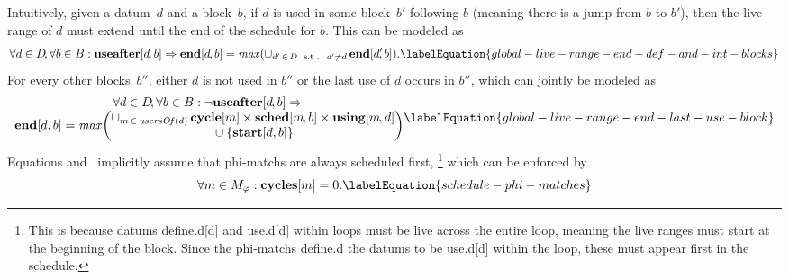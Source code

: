 Intuitively, given a \gls{datum}~$d$ and a \gls{block}~$b$\hspace{-1pt}, if $d$
is used in some \gls{block}~$b'$ following $b$ (meaning there is a jump from $b$
to $b'$), then the \gls{live range} of $d$ must extend until the end of the
schedule for $b$\hspace{-1pt}.
%
This can be modeled as
%
\begin{equation}
  \forall d \in \mDataSet \!,
  \forall b \in \mBlockSet :
  \mVar{useafter}[d \hspace{-1pt}, b]
  \mImp
  \mVar{end}[d \hspace{-1pt}, b]
  =
  \mMax(
    \cup_{d' \,\in\, \mDataSet \text{ \st } d' \neq d} \,
    \mVar{end}[d' \!\!, b]
  ).
  \labelEquation{global-live-range-end-def-and-int-blocks}
\end{equation}
%
For every other \glspl{block}~$b''\!$, either $d$ is not used in
$b''$ or the last use of $d$ occurs in $b''\!$, which can jointly be modeled as
%
\begin{equation}
  \begin{array}{@{}c@{}}
    \forall d \in \mDataSet \!,
    \forall b \in \mBlockSet :
    \neg\mVar{useafter}[d \hspace{-1pt}, b]
    \mImp \mbox{} \\
    \mVar{end}[d, b]
    =
    \mMax\!
    \left(
      \begin{array}{@{}c@{}}
        \cup_{m \,\in\, \mUsersOf(d)} \,
        \mVar{cycle}[m]
        \times
        \mVar{sched}[m \hspace{-1pt}, b]
        \times
        \mVar{using}[m \hspace{-1pt}, d] \\
        \mbox{} \cup
        \mSet{\mVar{start}[d, b]}
      \end{array}
    \right)
  \end{array}
  \labelEquation{global-live-range-end-last-use-block}
\end{equation}
%
Equations 
and~ implicitly assume that
\glspl{phi-match} are always scheduled first,%
%
\footnote{%
  This is because \glspl{datum} \gls{define.d}[d] and \gls{use.d}[d] within
  loops must be live across the entire loop, meaning the \glspl{live range} must
  start at the beginning of the \gls{block}.
  Since the \glspl{phi-match} \gls{define.d} the \glspl{datum} to be
  \gls{use.d}[d] within the loop, these must appear first in the schedule.
}
which can be enforced by
%
\begin{equation}
  \forall m \in \mPhiMatchSet :
  \mVar{cycles}[m] = 0.
  \labelEquation{schedule-phi-matches}
\end{equation}

